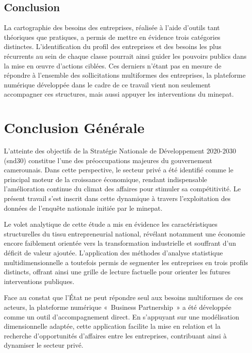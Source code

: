 \documentclass[12pt, a4paper, oneside]{report}
\begin{document}
\section*{Conclusion}
La cartographie des besoins des entreprises, réalisée à l'aide d'outils tant théoriques que pratiques, a permis de mettre en évidence trois catégories distinctes. L'identification du profil des entreprises et des besoins les plus récurrents au sein de chaque classe pourrait ainsi guider les pouvoirs publics dans la mise en œuvre d'actions ciblées. Ces derniers n'étant pas en mesure de répondre à l'ensemble des sollicitations multiformes des entreprises, la plateforme numérique développée dans le cadre de ce travail vient non seulement accompagner ces structures, mais aussi appuyer les interventions du \gls{minepat}. 
	\chapter*{Conclusion Générale}
	
L'atteinte des objectifs de la Stratégie Nationale de Développement 2020-2030 (\gls{snd30}) constitue l'une des préoccupations majeures du gouvernement camerounais. Dans cette perspective, le secteur privé a été identifié comme le principal moteur de la croissance économique, rendant indispensable l'amélioration continue du climat des affaires pour stimuler sa compétitivité. Le présent travail s'est inscrit dans cette dynamique à travers l'exploitation des données de l'enquête nationale initiée par le \gls{minepat}.

Le volet analytique de cette étude a mis en évidence les caractéristiques structurelles du tissu entrepreneurial national, révélant notamment une économie encore faiblement orientée vers la transformation industrielle et souffrant d'un déficit de valeur ajoutée. L'application des méthodes d'analyse statistique multidimensionnelle a toutefois permis de segmenter les entreprises en trois profils distincts, offrant ainsi une grille de lecture factuelle pour orienter les futures interventions publiques. 

Face au constat que l'État ne peut répondre seul aux besoins multiformes de ces acteurs, la plateforme numérique «~Business Partnership~» a été développée comme un outil d'accompagnement direct. En s'appuyant sur une modélisation dimensionnelle adaptée, cette application facilite la mise en relation et la recherche d'opportunités d'affaires entre les entreprises, contribuant ainsi à dynamiser le secteur privé.
\end{document}
